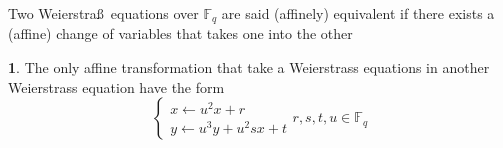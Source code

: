 \documentclass[10pt,handout]{beamer} %
\newcommand{\F}{\mathbb F}
\theoremstyle{definition}
\newtheorem{Note}[theorem]{\translate{Note}}
\begin{document}
\begin{frame}
% 
% 
% 
% 
% 
% 
\begin{Definition}
 Two Weierstra\ss\ equations over $\F_q$ are said (affinely) equivalent if there exists a (affine) change of variables that takes one
into the other
\end{Definition}
\pause


\begin{Note}{The only affine transformation that take a Weierstrass equations in another Weierstrass equation have the form}
$$\begin{cases}
x\longleftarrow u^2 x+r\\
y\longleftarrow u^3 y+ u^2s x + t
  \end{cases} r,s,t,u\in\F_q$$
\end{Note}
\end{frame}
\end{document}
